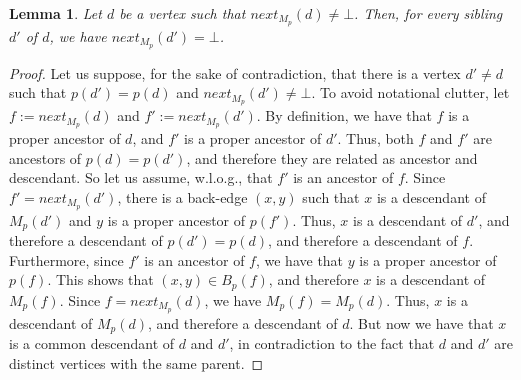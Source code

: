 \documentclass[11pt,a4paper]{article}
\newtheorem{lemma}[theorem]{Lemma}
\begin{document}
\begin{lemma}
\label{lemma:siblingsM}
Let $d$ be a vertex such that $\mathit{next}_{M_p}(d)\neq\bot$. Then, for every sibling $d'$ of $d$, we have $\mathit{next}_{M_p}(d')=\bot$.
\end{lemma}
\begin{proof}
Let us suppose, for the sake of contradiction, that there is a vertex $d'\neq d$ such that $p(d')=p(d)$ and $\mathit{next}_{M_p}(d')\neq\bot$. To avoid notational clutter, let $f:=\mathit{next}_{M_p}(d)$ and $f':=\mathit{next}_{M_p}(d')$. By definition, we have that $f$ is a proper ancestor of $d$, and $f'$ is a proper ancestor of $d'$. Thus, both $f$ and $f'$ are ancestors of $p(d)=p(d')$, and therefore they are related as ancestor and descendant. So let us assume, w.l.o.g., that $f'$ is an ancestor of $f$. Since $f'=\mathit{next}_{M_p}(d')$, there is a back-edge $(x,y)$ such that $x$ is a descendant of $M_p(d')$ and $y$ is a proper ancestor of $p(f')$. Thus, $x$ is a descendant of $d'$, and therefore a descendant of $p(d')=p(d)$, and therefore a descendant of $f$. Furthermore, since $f'$ is an ancestor of $f$, we have that $y$ is a proper ancestor of $p(f)$. This shows that $(x,y)\in B_p(f)$, and therefore $x$ is a descendant of $M_p(f)$. Since $f=\mathit{next}_{M_p}(d)$, we have $M_p(f)=M_p(d)$. Thus, $x$ is a descendant of $M_p(d)$, and therefore a descendant of $d$. But now we have that $x$ is a common descendant of $d$ and $d'$, in contradiction to the fact that $d$ and $d'$ are distinct vertices with the same parent.
\end{proof}
\end{document}

